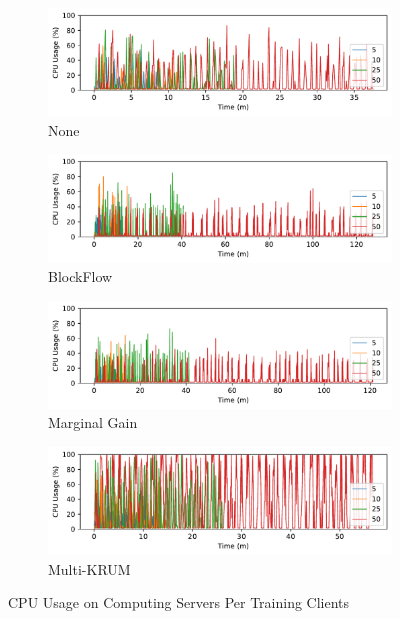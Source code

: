 \begin{figure}[!h]
    \centering
    \begin{subfigure}[b]{0.49\textwidth}
        \centering
        \includegraphics[width=\textwidth]{graphics/clients/cpu_none_server.pdf}
        \caption{None}
    \end{subfigure}
    \hfill
    \begin{subfigure}[b]{0.49\textwidth}
        \centering
        \includegraphics[width=\textwidth]{graphics/clients/cpu_blockflow_server.pdf}
        \caption{BlockFlow}
    \end{subfigure}
    \hfill
    \begin{subfigure}[b]{0.49\textwidth}
        \centering
        \includegraphics[width=\textwidth]{graphics/clients/cpu_marginalgain_server.pdf}
        \caption{Marginal Gain}
    \end{subfigure}
    \hfill
    \begin{subfigure}[b]{0.49\textwidth}
        \centering
        \includegraphics[width=\textwidth]{graphics/clients/cpu_multikrum_server.pdf}
        \caption{Multi-KRUM}
    \end{subfigure}
    \caption{CPU Usage on Computing Servers Per Training Clients}
    \label{fig:cpu_clients_degree_server}
\end{figure}

